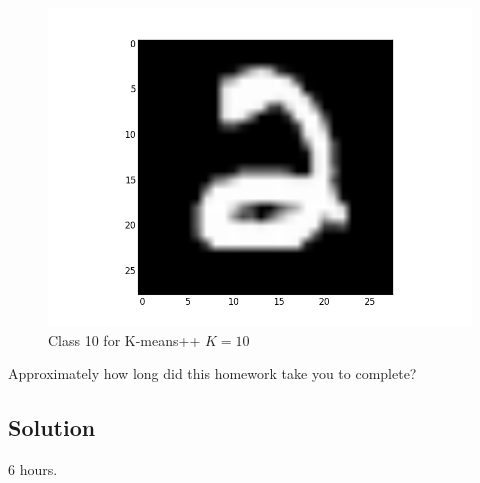 \documentclass[submit]{harvardml}
\begin{document}
\begin{figure}[ht]
    \includegraphics[scale=0.20]{K10-representative-9-2}
    \caption{Class 10 for K-means++ $K=10$}
\end{figure}

\newpage
\begin{problem}[Calibration, 1pt]
Approximately how long did this homework take you to complete?
\end{problem}
\subsection*{Solution}
6 hours.
\end{document}

